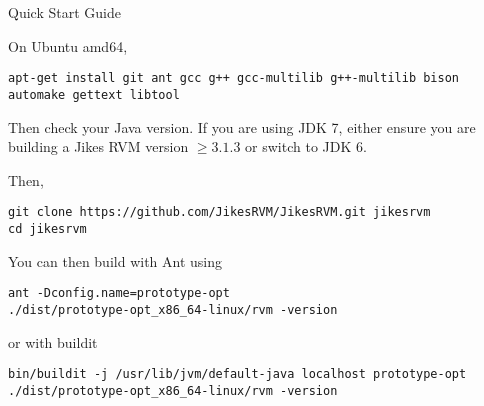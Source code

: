 \begin{chapter}{Quick Start Guide}
\label{cha:quickstartguide}

On Ubuntu amd64,

\begin{lstlisting}
apt-get install git ant gcc g++ gcc-multilib g++-multilib bison automake gettext libtool
\end{lstlisting}


Then check your Java version.  If you are using JDK 7, either ensure you are building a Jikes RVM version $\geq 3.1.3$ or switch to JDK 6.

Then, 
\begin{lstlisting}
git clone https://github.com/JikesRVM/JikesRVM.git jikesrvm
cd jikesrvm
\end{lstlisting}


You can then build with Ant using
\begin{lstlisting}
ant -Dconfig.name=prototype-opt
./dist/prototype-opt_x86_64-linux/rvm -version
\end{lstlisting}

or with buildit

\begin{lstlisting}
bin/buildit -j /usr/lib/jvm/default-java localhost prototype-opt
./dist/prototype-opt_x86_64-linux/rvm -version
\end{lstlisting}

\end{chapter}
